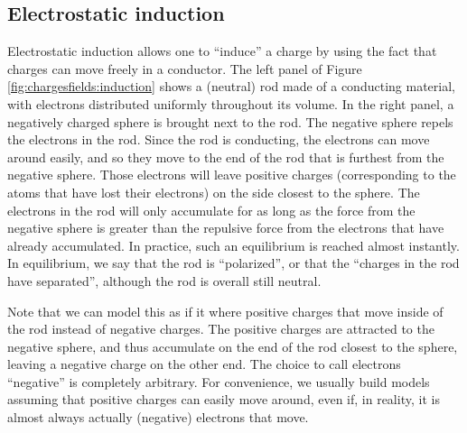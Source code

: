 
\subsection{Electrostatic induction}
Electrostatic induction allows one to ``induce'' a charge by using the fact that charges can move freely in a conductor. The left panel of Figure \ref{fig:chargesfields:induction} shows a (neutral) rod made of a conducting material, with electrons distributed uniformly throughout its volume. In the right panel, a negatively charged sphere is brought next to the rod. The negative sphere repels the electrons in the rod. Since the rod is conducting, the electrons can move around easily, and so they move to the end of the rod that is furthest from the negative sphere. Those electrons will leave positive charges (corresponding to the atoms that have lost their electrons) on the side closest to the sphere. The electrons in the rod will only accumulate for as long as the force from the negative sphere is greater than the repulsive force from the electrons that have already accumulated. In practice, such an equilibrium is reached almost instantly. In equilibrium, we say that the rod is ``polarized'', or that the ``charges in the rod have separated'', although the rod is overall still neutral.

Note that we can model this as if it where positive charges that move inside of the rod instead of negative charges. The positive charges are attracted to the negative sphere, and thus accumulate on the end of the rod closest to the sphere, leaving a negative charge on the other end. The choice to call electrons ``negative'' is completely arbitrary. For convenience, we usually build models assuming that positive charges can easily move around, even if, in reality, it is almost always actually (negative) electrons that move.


